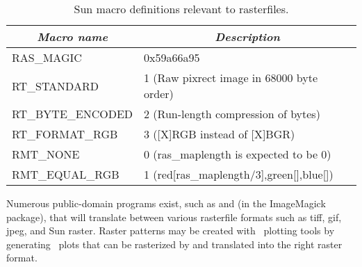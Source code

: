 \begin{table}[H]
\centering
\begin{tabular}{|l|l|}  \hline

\multicolumn{1}{|c}{\emph{Macro name}}  &       \multicolumn{1}{|c|}{\emph{Description}}        \\ \hline
RAS\_MAGIC      &       0x59a66a95  \\ \hline
RT\_STANDARD    &       1 (Raw pixrect image in 68000 byte order)  \\ \hline
RT\_BYTE\_ENCODED       &       2 (Run-length compression of bytes)  \\ \hline
RT\_FORMAT\_RGB &       3 ([X]RGB instead of [X]BGR)  \\ \hline
RMT\_NONE       &       0 (ras\_maplength is expected to be 0)  \\ \hline
RMT\_EQUAL\_RGB &       1 (red[ras\_maplength/3],green[],blue[])  \\ \hline

\end{tabular}

\caption{Sun macro definitions relevant to rasterfiles.}
\label{tbl:sundef}
\end{table} 

Numerous public-domain programs exist, such as  and
 (in the ImageMagick package), that will translate
between various rasterfile formats such as tiff, gif, jpeg, and
Sun raster.  Raster patterns may be created with \GMT\ plotting
tools by generating \PS\ plots that can be rasterized
by  and translated into the right raster format.
